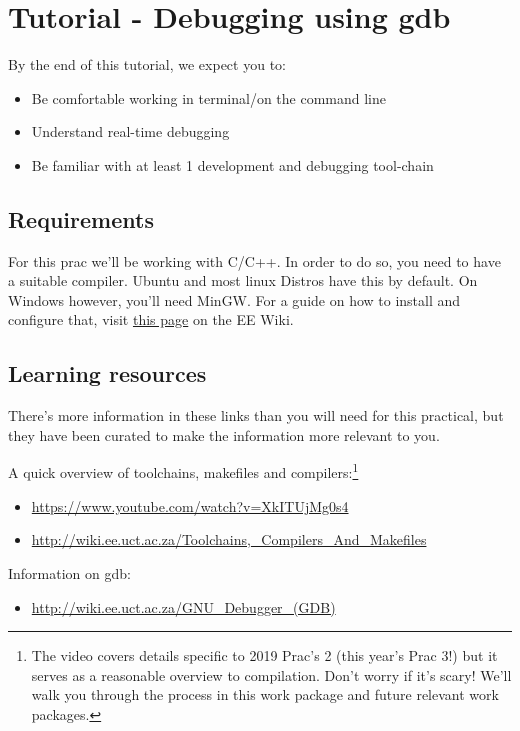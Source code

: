 \section{Tutorial - Debugging using gdb}
By the end of this tutorial, we expect you to:
\begin{itemize}
    \item Be comfortable working in terminal/on the command line
    \item Understand real-time debugging
    \item Be familiar with at least 1 development and debugging tool-chain
\end{itemize}

\subsection{Requirements}
For this prac we'll be working with C/C++. In order to do so, you need to have a suitable compiler. Ubuntu and most linux Distros have this by default. On Windows however, you'll need MinGW. For a guide on how to install and configure that, visit \href{http://wiki.ee.uct.ac.za/MinGW}{this page} on the EE Wiki.


\subsection{Learning resources}
There's more information in these links than you will need for this practical, but they have been curated to make the information more relevant to you.

A quick overview of toolchains, makefiles and compilers:\footnote{The video covers details specific to 2019 Prac's 2 (this year's Prac 3!) but it serves as a reasonable overview to compilation. Don't worry if it's scary! We'll walk you through the process in this work package and future relevant work packages.}
\begin{itemize}
    \item \href{https://www.youtube.com/watch?v=XkITUjMg0s4}{https://www.youtube.com/watch?v=XkITUjMg0s4}
    \item \href{http://wiki.ee.uct.ac.za/Toolchains,_Compilers_And_Makefiles}{http://wiki.ee.uct.ac.za/Toolchains,\_Compilers\_And\_Makefiles}
\end{itemize} 


Information on gdb: 
\begin{itemize}
    \item \href{http://wiki.ee.uct.ac.za/GNU\_Debugger\_(GDB)}{http://wiki.ee.uct.ac.za/GNU\_Debugger\_(GDB)}
\end{itemize}

